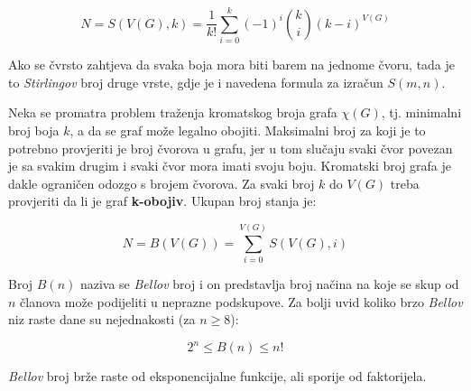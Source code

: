 \documentclass[times, utf8, diplomski, numeric]{fer}
\begin{document}
\begin{equation}
N = S(V(G), k) = \frac{1}{k!}\sum_{i=0}^{k} (-1)^i \binom{k}{i}(k-i)^{V(G)}  
\end{equation}

Ako se čvrsto zahtjeva da svaka boja mora biti barem na jednome čvoru, tada je to \emph{Stirlingov} broj druge vrste, gdje je i navedena formula za izračun $S(m,n)$.

Neka se promatra problem traženja kromatskog broja grafa $\chi(G)$, tj. minimalni broj boja $k$, a da se graf može legalno obojiti. Maksimalni broj za koji je to potrebno provjeriti je broj čvorova u grafu, jer u tom slučaju svaki čvor povezan je sa svakim drugim i svaki čvor mora imati svoju boju. Kromatski broj grafa je dakle ograničen odozgo s brojem čvorova. Za svaki broj $k$ do $V(G)$ treba provjeriti da li je graf \textbf{k-obojiv}. Ukupan broj stanja je:

\begin{equation}
N = B(V(G)) = \sum_{i=0}^{V(G)} S(V(G), i)
\end{equation}

Broj $B(n)$ naziva se \emph{Bellov} broj i on predstavlja broj načina na koje se skup od $n$ članova može podijeliti u neprazne podskupove. Za bolji uvid koliko brzo \emph{Bellov} niz raste dane su nejednakosti (za $n\ge 8$): 

\begin{equation}
2^n \le B(n) \le n! 
\end{equation}

\emph{Bellov} broj brže raste od eksponencijalne funkcije, ali sporije od faktorijela.
\end{document}
